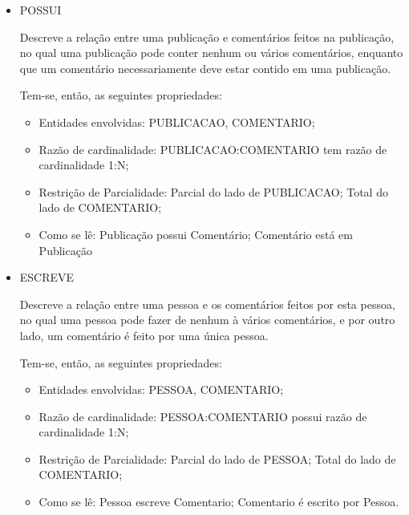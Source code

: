 \begin{itemize}
				\item POSSUI

Descreve a relação entre uma publicação e comentários feitos na publicação, no qual uma publicação pode conter nenhum ou vários comentários, enquanto que um comentário necessariamente deve estar contido em uma publicação.

Tem-se, então, as seguintes propriedades:
\begin{itemize}
				\item Entidades envolvidas: PUBLICACAO, COMENTARIO;
				\item Razão de cardinalidade: PUBLICACAO:COMENTARIO tem razão de cardinalidade 1:N;
				\item Restrição de Parcialidade: Parcial do lado de PUBLICACAO; Total do lado de COMENTARIO;
				\item Como se lê: Publicação possui Comentário; Comentário está em Publicação
\end{itemize}
\end{itemize}

\begin{itemize}
				\item ESCREVE

Descreve a relação entre uma pessoa e os comentários feitos por esta pessoa, no qual uma pessoa pode fazer de nenhum à vários comentários, e por outro lado, um comentário é feito por uma única pessoa.

Tem-se, então, as seguintes propriedades:
\begin{itemize}

\item Entidades envolvidas: PESSOA, COMENTARIO;
\item Razão de cardinalidade: PESSOA:COMENTARIO possui razão de cardinalidade 1:N;
\item Restrição de Parcialidade: Parcial do lado de PESSOA; Total do lado de COMENTARIO;
\item Como se lê: Pessoa escreve Comentario; Comentario é escrito por Pessoa.
\end{itemize}
\end{itemize}


